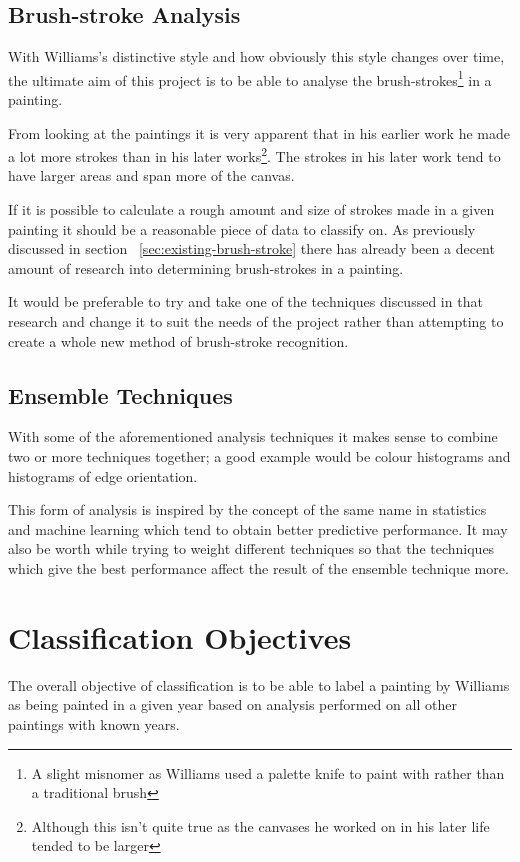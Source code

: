 \subsection{Brush-stroke Analysis}\label{sec:analysis-brush-stroke}
With Williams's distinctive style and how obviously this style changes over time, the ultimate aim 
of this project is to be able to analyse the brush-strokes\footnote{A slight misnomer as Williams 
used a palette knife to paint with rather than a traditional brush} in a painting.

From looking at the paintings it is very apparent that in his earlier work he made a lot more 
strokes than in his later works\footnote{Although this isn't quite true as the canvases he worked
on in his later life tended to be larger}. The strokes in his later work tend to have larger areas
and span more of the canvas.

If it is possible to calculate a rough amount and size of strokes made in a given painting it 
should be a reasonable piece of data to classify on. As previously discussed in section~
\ref{sec:existing-brush-stroke} there has already been a decent amount of research into determining
brush-strokes in a painting. 

It would be preferable to try and take one of the techniques discussed in that research and change
it to suit the needs of the project rather than attempting to create a whole new method of 
brush-stroke recognition.

\subsection{Ensemble Techniques}
With some of the aforementioned analysis techniques it makes sense to combine two or more 
techniques together; a good example would be colour histograms and histograms of edge orientation.

This form of analysis is inspired by the concept of the same name in statistics and machine 
learning which tend to obtain better predictive performance. It may also be worth while trying to
weight different techniques so that the techniques which give the best performance affect the 
result of the ensemble technique more.


\section{Classification Objectives}
The overall objective of classification is to be able to label a painting by Williams as 
being painted in a given year based on analysis performed on all other paintings with known years.

